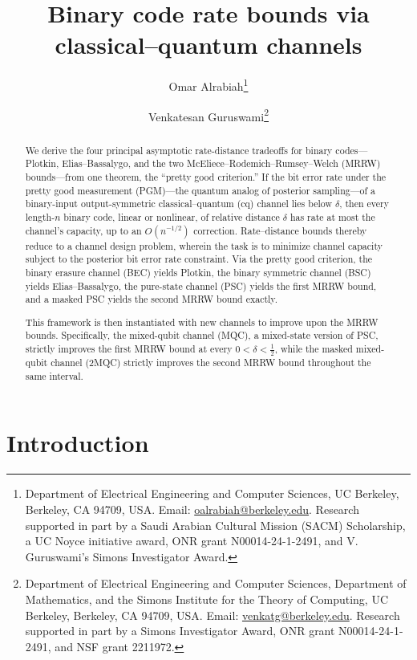 \documentclass[11pt]{article}
\title{Binary code rate bounds via classical--quantum channels}
\author{Omar Alrabiah\thanks{Department of Electrical Engineering and Computer Sciences, UC Berkeley, Berkeley, CA 94709, USA. Email: \url{oalrabiah@berkeley.edu}. Research supported in part by a Saudi Arabian Cultural Mission (SACM) Scholarship, a UC Noyce initiative award, ONR grant N00014-24-1-2491, and V. Guruswami's Simons Investigator Award.}
\and Venkatesan Guruswami\thanks{Department of Electrical Engineering and Computer Sciences, Department of Mathematics, and the Simons Institute for the Theory of Computing, UC Berkeley, Berkeley, CA 94709, USA. Email: \url{venkatg@berkeley.edu}. Research supported in part by a Simons Investigator Award, ONR grant N00014-24-1-2491, and NSF grant 2211972.}
}
\date{}
\theoremstyle{remark}
\begin{document}
\pagestyle{empty}
\maketitle
\thispagestyle{empty}

\begin{abstract}
We derive the four principal asymptotic rate-distance tradeoffs for binary codes---Plotkin, Elias--Bassalygo, and the two McEliece--Rodemich--Rumsey--Welch (MRRW) bounds---from one theorem, the ``pretty good criterion.'' If the bit error rate under the pretty good measurement (PGM)---the quantum analog of posterior sampling---of a binary-input output-symmetric classical--quantum (cq) channel lies below $\delta$, then every length-$n$ binary code, linear or nonlinear, of relative distance $\delta$ has rate at most the channel's capacity, up to an $O(n^{-1/2})$ correction. Rate--distance bounds thereby reduce to a channel design problem, wherein the task is to minimize channel capacity subject to the posterior bit error rate constraint. Via the pretty good criterion, the binary erasure channel (BEC) yields Plotkin, the binary symmetric channel (BSC) yields Elias--Bassalygo, the pure-state channel (PSC) yields the first MRRW bound, and a masked PSC yields the second MRRW bound exactly. 

\smallskip 
This framework is then instantiated with new channels to improve upon the MRRW bounds. Specifically, the mixed-qubit channel (MQC), a mixed-state version of PSC, strictly improves the first MRRW bound at every $0 < \delta < \frac{1}{2}$, while the masked mixed-qubit channel (2MQC) strictly improves the second MRRW bound throughout the same interval.
\end{abstract}

\begingroup
\small
\linespread{1.2}\selectfont
\makeatletter
\noindent\begin{minipage}{\textwidth}
\tableofcontents
\end{minipage}
\endgroup

\clearpage
\pagestyle{plain}

\section{Introduction}
\label{sec:introduction}
\end{document}
